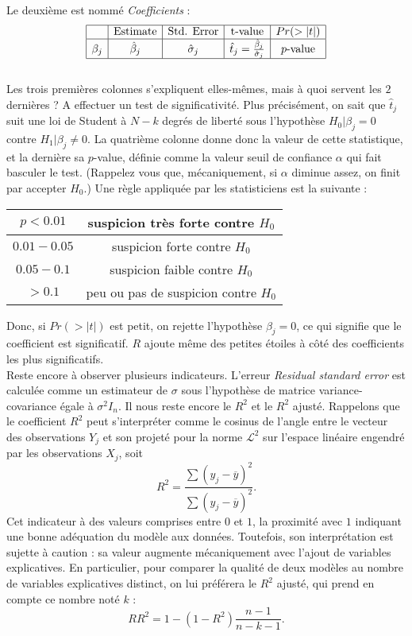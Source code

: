 Le deuxième est nommé \textit{Coefficients} :
\[\begin{array}{|c|c|c|c|c|}
	\hline
	& \text{Estimate} & \text{Std. Error} 	 & \text{t-value} & Pr(>|t|) \\
	\hline
 \beta_j & \hat \beta_j 	& \hat \sigma_j 	 & \hat t_j =\frac{\hat \beta_j}{\hat \sigma_j} & p\text{-value}\\
\hline
\end{array}\]
\\
Les trois premières colonnes s'expliquent elles-mêmes, mais à quoi servent les $2$ dernières ? A effectuer un test de significativité. Plus précisément, on sait que $\hat t_j$ suit une loi de Student à $N-k$ degrés de liberté sous l'hypothèse $H_0 | \beta_j = 0$ contre $H_1 | \beta_j \neq 0$. La quatrième colonne donne donc la valeur de cette statistique, et la dernière sa $p$-value, définie comme la valeur seuil de confiance $\alpha$ qui fait basculer le test. (Rappelez vous que, mécaniquement, si $\alpha$ diminue assez, on finit par accepter $H_0$.) Une règle appliquée par les statisticiens est la suivante :\\

\begin{center}
\begin{tabular}{|c|c|}
\hline
$p<0.01$ & suspicion très forte contre $H_0$ \\
\hline
$0.01-0.05$ & suspicion forte contre $H_0$ \\
\hline
$0.05-0.1$ & suspicion faible contre $H_0$ \\
\hline
$>0.1$ & peu ou pas de suspicion contre $H_0$\\
\hline
\end{tabular} 
\end{center}


Donc, si $Pr(>|t|)$ est petit, on rejette l'hypothèse $\beta_j = 0$, ce qui signifie que le coefficient est significatif. $R$ ajoute même des petites étoiles à côté des coefficients les plus significatifs.\\

Reste encore à observer plusieurs indicateurs. L'erreur \textit{Residual standard error} est calculée comme un estimateur de $\sigma$ sous l'hypothèse de matrice variance-covariance égale à $\sigma^2 I_n$. Il nous reste encore le $R^2$ et le $R^2$ ajusté. Rappelons que le coefficient $R^2$ peut s'interpréter comme le cosinus de l'angle entre le vecteur des observations $Y_j$ et son projeté pour la norme $\mathcal L^2$ sur l'espace linéaire engendré par les observations $X_j$, soit
\[R^2 = \frac{\sum (\hat y_j-\overline y)^2}{\sum ( y_j-\overline y)^2}.\]
Cet indicateur à des valeurs comprises entre $0$ et $1$, la proximité avec $1$ indiquant une bonne adéquation du modèle aux données. Toutefois, son interprétation est sujette à caution : sa valeur augmente mécaniquement avec l'ajout de variables explicatives. En particulier, pour comparer la qualité de deux modèles au nombre de variables explicatives distinct, on lui préférera le $R^2$ ajusté, qui prend en compte ce nombre noté $k$ :
\[RR^2 = 1-(1-R^2)\frac{n-1}{n-k-1}.\] 
